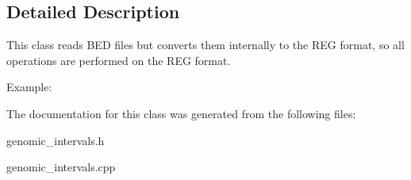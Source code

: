 \subsection{Detailed Description}
This class reads BED files but converts them internally to the REG format, so all operations are performed on the REG format. 

Example: 
 

The documentation for this class was generated from the following files:\begin{DoxyCompactItemize}
\item 
genomic\_\-intervals.h\item 
genomic\_\-intervals.cpp\end{DoxyCompactItemize}
